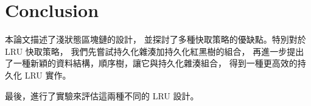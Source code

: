 \chapter{Conclusion}

本論文描述了淺狀態區塊鏈的設計，
並探討了多種快取策略的優缺點。特別對於 LRU 快取策略，
我們先嘗試持久化雜湊加持久化紅黑樹的組合，
再進一步提出了一種新穎的資料結構，順序樹，讓它與持久化雜湊組合，
得到一種更高效的持久化 LRU 實作。

最後，進行了實驗來評估這兩種不同的 LRU 設計。
